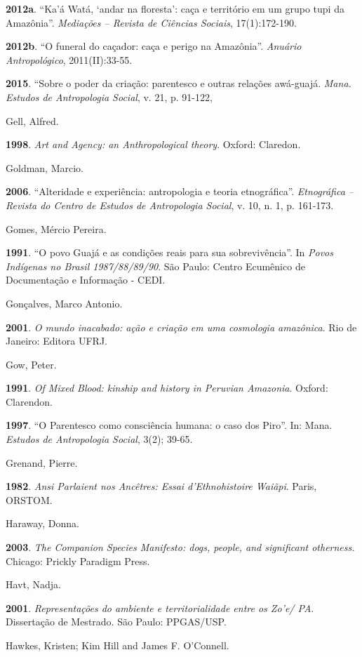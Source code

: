 \textbf{2012a}. ``Ka'á Watá, `andar na floresta': caça e território em
um grupo tupi da Amazônia''. \emph{Mediações -- Revista de Ciências
Sociais}, 17(1):172-190.

\textbf{2012b}. ``O funeral do caçador: caça e perigo na Amazônia''.
\emph{Anuário Antropológico}, 2011(II):33-55.

\textbf{2015}. ``Sobre o poder da criação: parentesco e outras relações
awá-guajá. \emph{Mana. Estudos de Antropologia Social}, v. 21, p.
91-122,

Gell, Alfred.

\textbf{1998}. \emph{Art and Agency: an Anthropological theory}. Oxford:
Claredon.

Goldman, Marcio.

\textbf{2006}. ``Alteridade e experiência: antropologia e teoria
etnográfica''. \emph{Etnográfica -- Revista do Centro de Estudos de
Antropologia Social}, v. 10, n. 1, p. 161-173.

Gomes, Mércio Pereira.

\textbf{1991}. ``O povo Guajá e as condições reais para sua
sobrevivência''. In \emph{Povos Indígenas no Brasil 1987/88/89/90}. São
Paulo: Centro Ecumênico de Documentação e Informação - CEDI.

Gonçalves, Marco Antonio.

\textbf{2001}. \emph{O mundo inacabado: ação e criação em uma cosmologia
amazônica}. Rio de Janeiro: Editora UFRJ.

Gow, Peter.

\textbf{1991}. \emph{Of Mixed Blood: kinship and history in Peruvian
Amazonia}. Oxford: Clarendon.

\textbf{1997}. ``O Parentesco como consciência humana: o caso dos Piro''.
In: Mana. \emph{Estudos de Antropologia Social}, 3(2); 39-65.

Grenand, Pierre.

\textbf{1982}. \emph{Ansi Parlaient nos Ancêtres: Essai d'Ethnohistoire
Waiãpi}. Paris, ORSTOM.

Haraway, Donna.

\textbf{2003}. \emph{The Companion Species Manifesto: dogs, people, and
significant otherness.} Chicago: Prickly Paradigm Press.

Havt, Nadja.

\textbf{2001}. \emph{Representações do ambiente e territorialidade entre
os Zo'e/ PA}. Dissertação de Mestrado. São Paulo: PPGAS/USP.

Hawkes, Kristen; Kim Hill and James F. O'Connell.

